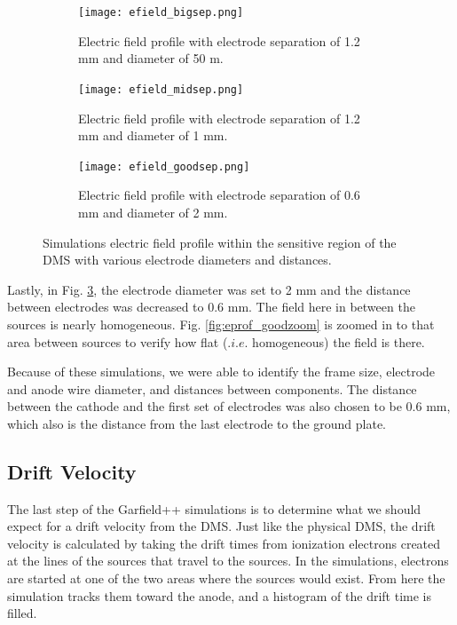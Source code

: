 \begin{figure}[h!]
	\centering
	\begin{subfigure}[b]{0.30\textwidth}
		\texttt{[image: efield\_bigsep.png]}
		\caption{Electric field profile with electrode separation of 1.2 mm and diameter of 50 \textmu m.}
		\label{fig:eprof_bigsep}
	\end{subfigure}
	\begin{subfigure}[b]{0.30\textwidth}
		\texttt{[image: efield\_midsep.png]}
		\caption{Electric field profile with electrode separation of 1.2 mm and diameter of 1 mm.}
		\label{fig:eprof_midsep}
	\end{subfigure}
	\begin{subfigure}[b]{0.30\textwidth}
		\texttt{[image: efield\_goodsep.png]}
		\caption{Electric field profile with electrode separation of 0.6 mm and diameter of 2 mm.}
		\label{fig:eprof_goodsep}
	\end{subfigure}
	\caption{Simulations electric field profile within the sensitive region of the DMS with various electrode diameters and distances.}
	\label{fig:eprof}
\end{figure}

Lastly, in Fig. \ref{fig:eprof_goodsep}, the electrode diameter was set to 2 mm and the distance between electrodes was decreased to 0.6 mm. The field here in between the sources is nearly homogeneous. Fig. \ref{fig:eprof_goodzoom} is zoomed in to that area between sources to verify how flat ($.i.e.$ homogeneous) the field is there.

Because of these simulations, we were able to identify the frame size, electrode and anode wire diameter, and distances between components. The distance between the cathode and the first set of electrodes was also chosen to be 0.6 mm, which also is the distance from the last electrode to the ground plate.

\subsection{Drift Velocity}
The last step of the Garfield++ simulations is to determine what we should expect for a drift velocity from the DMS. Just like the physical DMS, the drift velocity is calculated by taking the drift times from ionization electrons created at the lines of the sources that travel to the sources. In the simulations, electrons are started at one of the two areas where the sources would exist. From here the simulation tracks them toward the anode, and a histogram of the drift time is filled.

